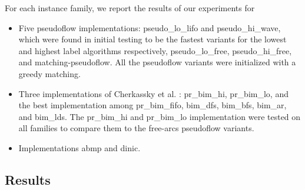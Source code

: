 \documentclass{article}
\begin{document}
For each instance family, we report the results of our experiments for
\begin{itemize}
\item Five pseudoflow implementations: {\sf pseudo\_lo\_lifo} and {\sf pseudo\_hi\_wave}, which were found in initial testing to be the fastest variants for the lowest and highest label algorithms respectively, {\sf pseudo\_lo\_free}, {\sf pseudo\_hi\_free}, and {\sf matching-pseudoflow}.  All the pseudoflow variants were initialized with a greedy matching.
\item Three implementations of Cherkassky et al. \cite{CheGMSS98}: {\sf pr\_bim\_hi}, {\sf pr\_bim\_lo}, and the best implementation among {\sf pr\_bim\_fifo}, {\sf bim\_dfs}, {\sf bim\_bfs}, {\sf bim\_ar}, and {\sf bim\_lds}. The {\sf pr\_bim\_hi} and {\sf pr\_bim\_lo} implementation were tested on all families to compare them to the free-arcs pseudoflow variants.
\item Implementations {\sf abmp} and {\sf dinic}.
\end{itemize}

\subsection{Results}
\end{document}
